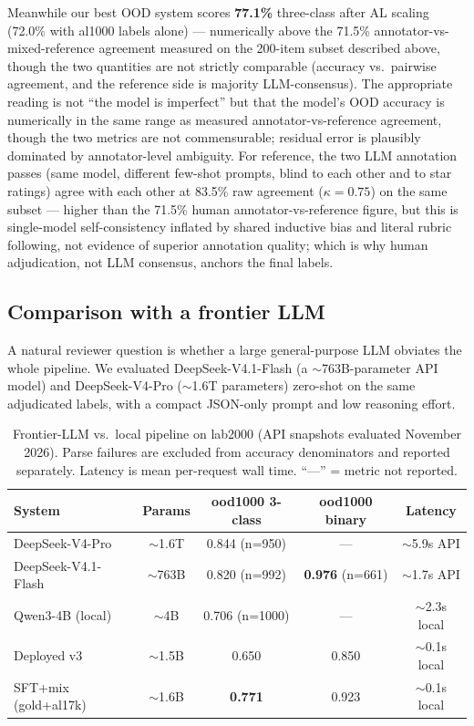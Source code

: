\documentclass[11pt,a4paper]{article}
\begin{document}
Meanwhile our best OOD system scores \textbf{77.1\%} three-class after
AL scaling (72.0\% with al1000 labels alone) --- numerically above the
71.5\% annotator-vs-mixed-reference agreement measured on the
200-item subset described above, though the two quantities are not
strictly comparable (accuracy vs.\ pairwise agreement, and the
reference side is majority LLM-consensus). The
appropriate reading is not ``the model is imperfect'' but that the
model's OOD accuracy is numerically in the same range as measured
annotator-vs-reference agreement, though the two metrics are not
commensurable; residual error is plausibly dominated by
annotator-level ambiguity. For reference, the two LLM annotation
passes (same model, different few-shot prompts, blind to each other
and to star ratings) agree with each other at 83.5\% raw agreement
($\kappa = 0.75$) on the same subset --- higher than the 71.5\%
human annotator-vs-reference figure, but this is single-model self-consistency inflated
by shared inductive bias and literal rubric following, not evidence of
superior annotation quality; which is why human adjudication, not LLM
consensus, anchors the final labels.

\subsection{Comparison with a frontier LLM}
\label{sec:llm}

A natural reviewer question is whether a large general-purpose LLM
obviates the whole pipeline. We evaluated DeepSeek-V4.1-Flash (a
$\sim$763B-parameter API model) and DeepSeek-V4-Pro ($\sim$1.6T
parameters) zero-shot on the
same adjudicated labels, with a compact JSON-only prompt and
low reasoning effort.

\begin{table}[H]
\centering\small
\caption{Frontier-LLM vs.\ local pipeline on lab2000 (API snapshots
evaluated November 2026). Parse failures
are excluded from accuracy denominators and reported separately.
Latency is mean per-request wall time. ``---'' = metric not reported.}
\label{tab:llm}
\begin{tabular}{lcccc}
\toprule
System & Params & ood1000 3-class & ood1000 binary & Latency \\
\midrule
DeepSeek-V4-Pro     & $\sim$1.6T     & 0.844 (n=950) & --- & $\sim$5.9s API \\
DeepSeek-V4.1-Flash & $\sim$763B    & 0.820 (n=992) & \textbf{0.976} (n=661) & $\sim$1.7s API \\
Qwen3-4B (local)    & $\sim$4B      & 0.706 (n=1000) & --- & $\sim$2.3s local \\
Deployed v3         & $\sim$1.5B    & 0.650 & 0.850 & $\sim$0.1s local \\
SFT+mix (gold+al17k) & $\sim$1.6B    & \textbf{0.771} & 0.923 & $\sim$0.1s local \\
\bottomrule
\end{tabular}
\end{table}
\end{document}
